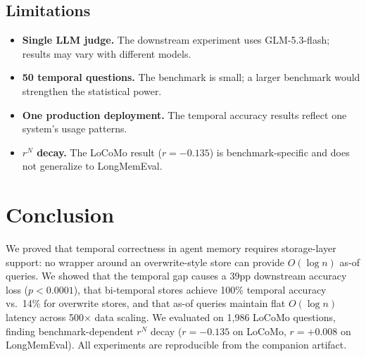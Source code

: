 \documentclass{article}
\begin{document}
\subsection{Limitations}
\begin{itemize}
\item \textbf{Single LLM judge.} The downstream experiment uses GLM-5.3-flash; results may vary with different models.
\item \textbf{50 temporal questions.} The benchmark is small; a larger benchmark would strengthen the statistical power.
\item \textbf{One production deployment.} The temporal accuracy results reflect one system's usage patterns.
\item \textbf{$r^N$ decay.} The LoCoMo result ($r = -0.135$) is benchmark-specific and does not generalize to LongMemEval.
\end{itemize}

\section{Conclusion}

We proved that temporal correctness in agent memory requires storage-layer support: no wrapper around an overwrite-style store can provide $O(\log n)$ as-of queries. We showed that the temporal gap causes a 39pp downstream accuracy loss ($p < 0.0001$), that bi-temporal stores achieve 100\% temporal accuracy vs.\ 14\% for overwrite stores, and that as-of queries maintain flat $O(\log n)$ latency across 500$\times$ data scaling. We evaluated on 1{,}986 LoCoMo questions, finding benchmark-dependent $r^N$ decay ($r = -0.135$ on LoCoMo, $r = +0.008$ on LongMemEval). All experiments are reproducible from the companion artifact.
\end{document}
